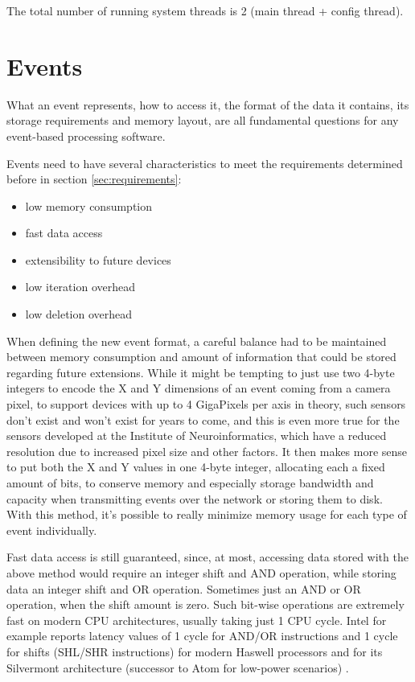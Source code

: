 \documentclass[a4paper,12pt]{report}
\begin{document}
The total number of running system threads is 2 (main thread + config thread).

\section{Events} \label{sec:events}

What an event represents, how to access it, the format of the data it contains, its storage requirements and memory layout, are all fundamental questions for any event-based processing software.

Events need to have several characteristics to meet the requirements determined before in section \ref{sec:requirements}:
\begin{itemize}
\item low memory consumption
\item fast data access
\item extensibility to future devices
\item low iteration overhead
\item low deletion overhead
\end{itemize}

When defining the new event format, a careful balance had to be maintained between memory consumption and amount of information that could be stored regarding future extensions. While it might be tempting to just use two 4-byte integers to encode the X and Y dimensions of an event coming from a camera pixel, to support devices with up to 4 GigaPixels per axis in theory, such sensors don't exist and won't exist for years to come, and this is even more true for the sensors developed at the Institute of Neuroinformatics, which have a reduced resolution due to increased pixel size and other factors. It then makes more sense to put both the X and Y values in one 4-byte integer, allocating each a fixed amount of bits, to conserve memory and especially storage bandwidth and capacity when transmitting events over the network or storing them to disk. With this method, it's possible to really minimize memory usage for each type of event individually.

Fast data access is still guaranteed, since, at most, accessing data stored with the above method would require an integer shift and AND operation, while storing data an integer shift and OR operation. Sometimes just an AND or OR operation, when the shift amount is zero. Such bit-wise operations are extremely fast on modern CPU architectures, usually taking just 1 CPU cycle. Intel for example reports latency values of 1 cycle for AND/OR instructions and 1 cycle for shifts (SHL/SHR instructions) for modern Haswell processors and for its Silvermont architecture (successor to Atom for low-power scenarios) \cite{intel_manual}.
\end{document}
